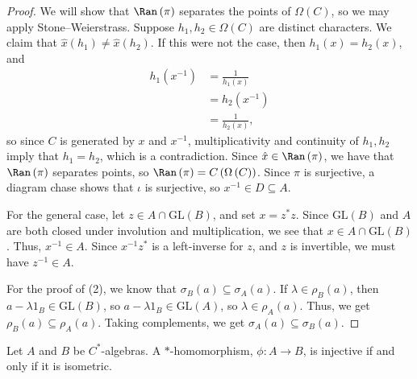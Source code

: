 \documentclass[10pt]{mypackage}
\newcommand{\GL}{\text{GL}}
\begin{document}
\begin{proof}
  We will show that $\Ran\left(\pi\right)$ separates the points of $\Omega\left(C\right)$, so we may apply Stone--Weierstrass. Suppose $h_1,h_2\in \Omega\left(C\right)$ are distinct characters. We claim that $\hat{x}\left(h_1\right) \neq \hat{x}\left(h_2\right)$. If this were not the case, then $h_1\left(x\right) = h_2\left(x\right)$, and
  \begin{align*}
    h_1\left(x^{-1}\right) &= \frac{1}{h_1\left(x\right)}\\
                           &= h_2\left(x^{-1}\right)\\
                           &= \frac{1}{h_2\left(x\right)},
  \end{align*}
  so since $C$ is generated by $x$ and $x^{-1}$, multiplicativity and continuity of $h_1,h_2$ imply that $h_1 = h_2$, which is a contradiction. Since $\hat{x}\in \Ran\left(\pi\right)$, we have that $\Ran\left(\pi\right)$ separates points, so $\Ran\left(\pi\right) = C\left(\Omega\left(C\right)\right)$. Since $\pi$ is surjective, a diagram chase shows that $\iota$ is surjective, so $x^{-1}\in D\subseteq A$.\newline

  For the general case, let $z\in A\cap \GL\left(B\right)$, and set $x = z^{\ast}z$. Since $\GL\left(B\right)$ and $A$ are both closed under involution and multiplication, we see that $x\in A\cap \GL\left(B\right)$. Thus, $x^{-1}\in A$. Since $x^{-1}z^{\ast}$ is a left-inverse for $z$, and $z$ is invertible, we must have $z^{-1}\in A$.\newline

  For the proof of (2), we know that $\sigma_B\left(a\right)\subseteq\sigma_A\left(a\right)$. If $\lambda\in \rho_B\left(a\right)$, then $a-\lambda 1_B\in \GL\left(B\right)$, so $a - \lambda 1_B\in \GL\left(A\right)$, so $\lambda\in \rho_A\left(a\right)$. Thus, we get $\rho_B\left(a\right)\subseteq \rho_A\left(a\right)$. Taking complements, we get $\sigma_A\left(a\right)\subseteq \sigma_B\left(a\right)$.
\end{proof}
\begin{proposition}
  Let $A$ and $B$ be $C^{\ast}$-algebras. A $\ast$-homomorphism, $\phi\colon A\rightarrow B$, is injective if and only if it is isometric.
\end{proposition}
\end{document}
